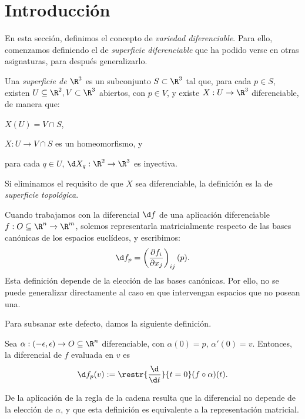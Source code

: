 \section{Introducción}

En esta sección, definimos el concepto de \emph{variedad diferenciable}. Para
ello, comenzamos definiendo el de \emph{superficie diferenciable} que ha podido
verse en otras asignaturas, para después generalizarlo.
\begin{ndef}
  Una \emph{superficie de $\R^{3}$} es un subconjunto $S\subset \R^{3}$ tal que,
  para cada $p\in S$, existen $U\subseteq \R^{2}, V\subset \R^{3}$ abiertos, con
  $p\in V$, y existe $X: U\to \R^{3}$ diferenciable, de manera que:
  \begin{nlist}
  \item
    $X(U) = V\cap S$,
  \item
    $X: U\to V\cap S$ es un homeomorfismo, y
  \item
    para cada $q\in U$, $\d X_{q}: \R^{2} \to \R^{3}$ es inyectiva.
  \end{nlist}
\end{ndef}
\begin{nota}
  Si eliminamos el requisito de que $X$ sea diferenciable, la definición es la
  de \emph{superficie topológica}.
\end{nota}
Cuando trabajamos con la diferencial $\d f$ de una aplicación diferenciable $f:
O\subseteq \R^{n} \to \R^{m}$, solemos representarla matricialmente respecto de
las bases canónicas de los espacios euclídeos, y escribimos:
\[
  \d f_{p} = \left(\frac{\partial f_{i}}{\partial x_{j}}\right)_{ij}(p)
.\]
Esta definición depende de la elección de las bases canónicas. Por ello, no se
puede generalizar directamente al caso en que intervengan espacios que no posean
una.

Para subsanar este defecto, damos la siguiente definición.
\begin{ndef}
  Sea $\alpha: (-\epsilon,\epsilon) \to O\subseteq \R^{n}$ diferenciable, con
  $\alpha(0) = p$, $\alpha'(0) = v$. Entonces, la diferencial de $f$ evaluada en
  $v$ es
  \[
    \d f_{p}(v) := \restr{\frac{\d}{\d t}}{t=0} (f\circ \alpha)(t)
  .\]
\end{ndef}
De la aplicación de la regla de la cadena resulta que la diferencial no depende
de la elección de $\alpha$, y que esta definición es equivalente a la
representación matricial.

